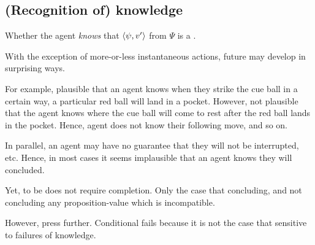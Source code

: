 \subsection{(Recognition of) knowledge}
\label{sec:knowledge}

\begin{note}
  Whether the agent \emph{knows} that \(\langle \psi, v' \rangle\) from \(\Psi\) is a \fc{}.
\end{note}

\begin{note}
  With the exception of more-or-less instantaneous actions, future may develop in surprising ways.

  For example, plausible that an agent knows when they strike the cue ball in a certain way, a particular red ball will land in a pocket.
  However, not plausible that the agent knows where the cue ball will come to rest after the red ball lands in the pocket.
  Hence, agent does not know their following move, and so on.

  In parallel, an agent may have no guarantee that they will not be interrupted, etc.
  Hence, in most cases it seems implausible that an agent knows they will concluded.

  Yet, to be \fc{} does not require completion.
  Only the case that concluding, and not concluding any proposition-value which is incompatible.
\end{note}

\begin{note}
  However, press further.
  Conditional fails because it is not the case that sensitive to failures of knowledge.
\end{note}

